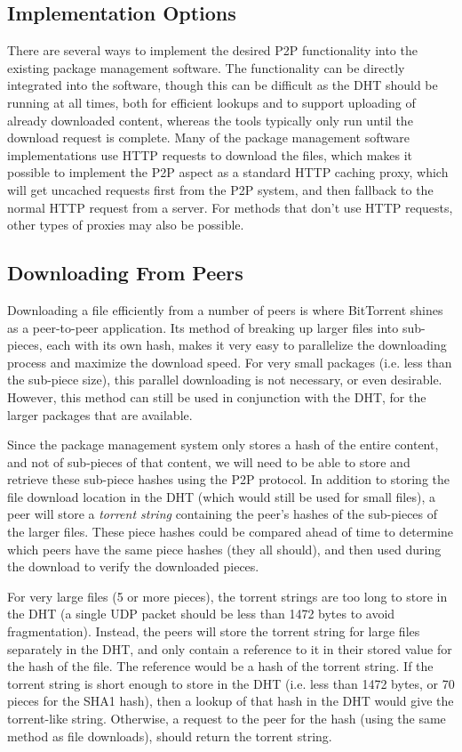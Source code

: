 \documentclass[conference]{IEEEtran}
\begin{document}
\subsection{Implementation Options}
\label{imp_options}

There are several ways to implement the desired P2P functionality
into the existing package management software. The functionality can
be directly integrated into the software, though this can be
difficult as the DHT should be running at all times, both for
efficient lookups and to support uploading of already downloaded
content, whereas the tools typically only run until the download request is complete.
Many of the package management software implementations use
HTTP requests to download the files, which makes it possible to
implement the P2P aspect as a standard HTTP caching proxy, which
will get uncached requests first from the P2P system, and then
fallback to the normal HTTP request from a server. For methods that
don't use HTTP requests, other types of proxies may also be
possible.

\subsection{Downloading From Peers}
\label{downloading}

Downloading a file efficiently from a number of peers is where
BitTorrent shines as a peer-to-peer application. Its method of
breaking up larger files into sub-pieces, each with its own hash,
makes it very easy to parallelize the downloading process and
maximize the download speed. For very small packages (i.e. less than
the sub-piece size), this parallel downloading is not necessary, or
even desirable. However, this method can still be used in
conjunction with the DHT, for the larger packages that are
available.

Since the package management system only stores a hash of the entire
content, and not of sub-pieces of that content, we will need to be
able to store and retrieve these sub-piece hashes using the P2P protocol.
In addition to storing the file download location in the DHT (which would still
be used for small files), a peer will store a \emph{torrent string}
containing the peer's hashes of the sub-pieces of the larger
files. These piece hashes could be compared ahead of time to
determine which peers have the same piece hashes (they all should),
and then used during the download to verify the downloaded pieces.

For very large files (5 or more pieces), the torrent strings
are too long to store in the DHT (a single UDP packet should be less
than 1472 bytes to avoid fragmentation). Instead, the peers will
store the torrent string for large files separately in the DHT, and
only contain a reference to it in their stored value for the hash of
the file. The reference would be a hash of the torrent string. If
the torrent string is short enough to store in the DHT (i.e. less
than 1472 bytes, or 70 pieces for the SHA1 hash), then a
lookup of that hash in the DHT would give the torrent-like string.
Otherwise, a request to the peer for the hash (using the same
method as file downloads), should return the torrent string.
\end{document}
